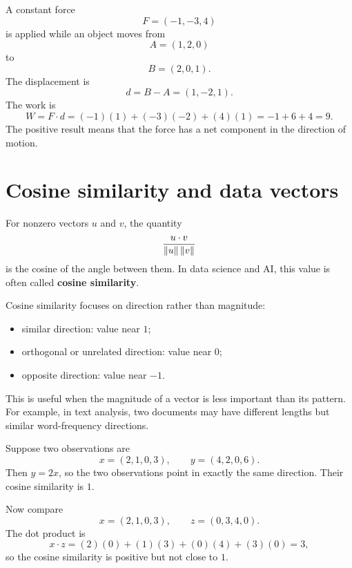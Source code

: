 \begin{examplebox}[title={Example 3.8: Work by a constant force}]
A constant force
\[
  F=(-1,-3,4)
\]
is applied while an object moves from
\[
  A=(1,2,0)
\]
to
\[
  B=(2,0,1).
\]
The displacement is
\[
  d=B-A=(1,-2,1).
\]
The work is
\[
  W=F\cdot d=(-1)(1)+(-3)(-2)+(4)(1)=-1+6+4=9.
\]
The positive result means that the force has a net component in the direction of motion.
\end{examplebox}

\section{Cosine similarity and data vectors}

For nonzero vectors $u$ and $v$, the quantity
\[
  \frac{u\cdot v}{\left\lVert u\right\rVert\left\lVert v\right\rVert}
\]
is the cosine of the angle between them. In data science and AI, this value is often called \textbf{cosine similarity}.

Cosine similarity focuses on direction rather than magnitude:
\begin{itemize}
\item similar direction: value near $1$;
\item orthogonal or unrelated direction: value near $0$;
\item opposite direction: value near $-1$.
\end{itemize}

This is useful when the magnitude of a vector is less important than its pattern. For example, in text analysis, two documents may have different lengths but similar word-frequency directions.

\begin{examplebox}[title={Example 3.9: Cosine similarity of data vectors}]
Suppose two observations are
\[
  x=(2,1,0,3), \qquad y=(4,2,0,6).
\]
Then $y=2x$, so the two observations point in exactly the same direction. Their cosine similarity is $1$.

Now compare
\[
  x=(2,1,0,3), \qquad z=(0,3,4,0).
\]
The dot product is
\[
  x\cdot z=(2)(0)+(1)(3)+(0)(4)+(3)(0)=3,
\]
so the cosine similarity is positive but not close to $1$.
\end{examplebox}

